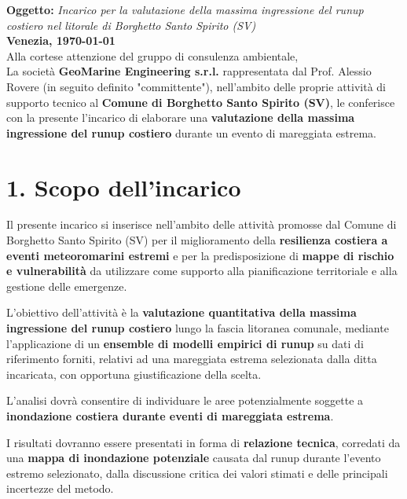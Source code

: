 \documentclass[11pt,a4paper,roman]{moderncv}
\begin{document}
\date{\today}

\makelettertitle

\noindent
\textbf{Oggetto:} \textit{Incarico per la valutazione della massima ingressione del runup costiero nel litorale di Borghetto Santo Spirito (SV)} \\[0.5em]

\noindent
\textbf{Venezia, \today} \\[1em]

Alla cortese attenzione del gruppo di consulenza ambientale, \\[0.5em]

La società \textbf{GeoMarine Engineering s.r.l.} rappresentata dal Prof. Alessio Rovere (in seguito definito "committente"), nell’ambito delle proprie attività di supporto tecnico al \textbf{Comune di Borghetto Santo Spirito (SV)}, le conferisce con la presente l’incarico di elaborare una \textbf{valutazione della massima ingressione del runup costiero} durante un evento di mareggiata estrema.

\section*{1. Scopo dell’incarico}
Il presente incarico si inserisce nell’ambito delle attività promosse dal Comune di Borghetto Santo Spirito (SV) per il miglioramento della \textbf{resilienza costiera a eventi meteoromarini estremi} e per la predisposizione di \textbf{mappe di rischio e vulnerabilità} da utilizzare come supporto alla pianificazione territoriale e alla gestione delle emergenze.

L’obiettivo dell’attività è la \textbf{valutazione quantitativa della massima ingressione del runup costiero} lungo la fascia litoranea comunale, mediante l’applicazione di un \textbf{ensemble di modelli empirici di runup} su dati di riferimento forniti, relativi ad una mareggiata estrema selezionata dalla ditta incaricata, con opportuna giustificazione della scelta.

L’analisi dovrà consentire di individuare le aree potenzialmente soggette a \textbf{inondazione costiera durante eventi di mareggiata estrema}.

I risultati dovranno essere presentati in forma di \textbf{relazione tecnica}, corredati da una \textbf{mappa di inondazione potenziale} causata dal runup durante l'evento estremo selezionato, dalla discussione critica dei valori stimati e delle principali incertezze del metodo.  
\end{document}
